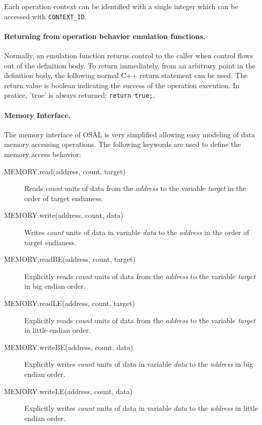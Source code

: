 \documentclass[a4paper,twoside]{tceusermanual}
\begin{document}
Each operation context can be identified with a single integer which
can be accessed with \verb#CONTEXT_ID#.

\paragraph{Returning from operation behavior emulation functions.}
Normally, an emulation function returns control to the caller when control
flows out of the definition body.  To return immediately, from an arbitrary
point in the definition body, the following normal C++ return 
statement can be used. The return value is boolean indicating the success
of the operation execution. In pratice, 'true' is always returned:
\verb|return true;|.

\paragraph{Memory Interface.}

The memory interface of OSAL is very simplified allowing easy modeling of
data memory accessing operations. The following keywords are used
to define the memory access behavior:

\begin{description}
\item[MEMORY.read(address, count, target)]%
  Reads \emph{count} units of data from the \emph{address} to the variable
  \emph{target} in the order of target endianess.
\item[MEMORY.write(address, count, data)]%
  Writes \emph{count} units of data in variable \emph{data} to
  the \emph{address} in the order of target endianess.
\item[MEMORY.readBE(address, count, target)]%
   Explicitly reads \emph{count} units of data from the \emph{address} to the variable
   \emph{target} in big endian order.
\item[MEMORY.readLE(address, count, target)]%
   Explicitly reads \emph{count} units of data from the \emph{address} to the variable
   \emph{target} in little endian order.
\item[MEMORY.writeBE(address, count, data)]%
  Explicitly writes \emph{count} units of data in variable \emph{data} to
  the \emph{address} in big endian order.
\item[MEMORY.writeLE(address, count, data)]%
  Explicitly writes \emph{count} units of data in variable \emph{data} to
  the \emph{address} in little endian order.
\end{description}
\end{document}
